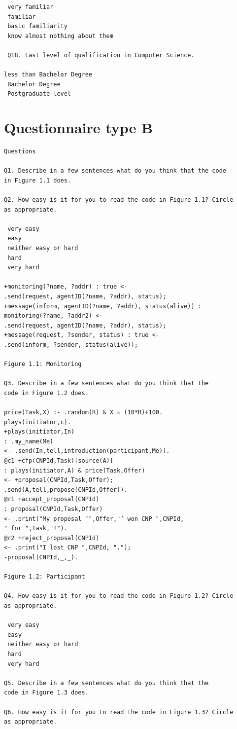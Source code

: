 \documentclass[a4paper,12pt,oneside,fleqn]{book} %
\begin{document}
{\begin{verbatim}
 very familiar
 familiar
 basic familiarity
 know almost nothing about them

 Q18. Last level of qualification in Computer Science.

less than Bachelor Degree
 Bachelor Degree
 Postgraduate level
\end{verbatim}


\chapter{Questionnaire type B}\label{app:SurveyB} %
\begin{verbatim}
Questions

Q1. Describe in a few sentences what do you think that the code
in Figure 1.1 does.

Q2. How easy is it for you to read the code in Figure 1.1? Circle
as appropriate.

 very easy
 easy
 neither easy or hard
 hard
 very hard

+monitoring(?name, ?addr) : true <-
.send(request, agentID(?name, ?addr), status);
+message(inform, agentID(?name, ?addr), status(alive)) :
monitoring(?name, ?addr2) <-
.send(request, agentID(?name, ?addr), status);
+message(request, ?sender, status) : true <-
.send(inform, ?sender, status(alive));

Figure 1.1: Monitoring

Q3. Describe in a few sentences what do you think that the
code in Figure 1.2 does.

price(Task,X) :- .random(R) & X = (10*R)+100.
plays(initiator,c).
+plays(initiator,In)
: .my_name(Me)
<- .send(In,tell,introduction(participant,Me)).
@c1 +cfp(CNPId,Task)[source(A)]
: plays(initiator,A) & price(Task,Offer)
<- +proposal(CNPId,Task,Offer);
.send(A,tell,propose(CNPId,Offer)).
@r1 +accept_proposal(CNPId)
: proposal(CNPId,Task,Offer)
<- .print("My proposal ’",Offer,"’ won CNP ",CNPId,
" for ",Task,"!").
@r2 +reject_proposal(CNPId)
<- .print("I lost CNP ",CNPId, ".");
-proposal(CNPId,_,_).

Figure 1.2: Participant

Q4. How easy is it for you to read the code in Figure 1.2? Circle
as appropriate.

 very easy
 easy
 neither easy or hard
 hard
 very hard

Q5. Describe in a few sentences what do you think that the
code in Figure 1.3 does.

Q6. How easy is it for you to read the code in Figure 1.3? Circle
as appropriate.


\end{verbatim}}
\end{document}
